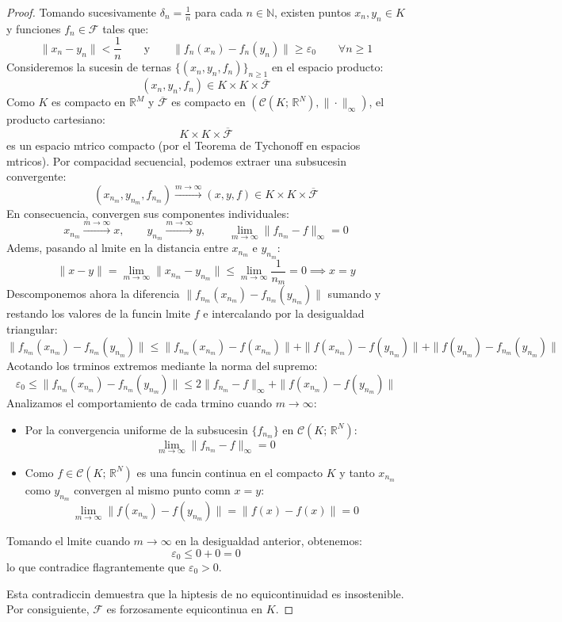 \begin{proof}
    Tomando sucesivamente $\delta_n = \frac{1}{n}$ para cada $n \in \mathbb{N}$, existen puntos $x_n, y_n \in K$ y funciones $f_n \in \mathcal{F}$ tales que:
    \[
        \|x_n - y_n\| < \frac{1}{n} \qquad \text{y} \qquad \|f_n(x_n) - f_n(y_n)\| \geq \varepsilon_0 \qquad \forall n \geq 1
    \]
    Consideremos la sucesin de ternas $\{(x_n, y_n, f_n)\}_{n \geq 1}$ en el espacio producto:
    \[
        (x_n, y_n, f_n) \in K \times K \times \overline{\mathcal{F}}
    \]
    Como $K$ es compacto en $\mathbb{R}^M$ y $\overline{\mathcal{F}}$ es compacto en $(\mathcal{C}(K; \, \mathbb{R}^N), \|\cdot\|_\infty)$, el producto cartesiano:
    \[
        K \times K \times \overline{\mathcal{F}}
    \]
    es un espacio mtrico compacto (por el Teorema de Tychonoff en espacios mtricos). Por compacidad secuencial, podemos extraer una subsucesin convergente:
    \[
        (x_{n_m}, y_{n_m}, f_{n_m}) \xrightarrow{m \to \infty} (x, y, f) \in K \times K \times \overline{\mathcal{F}}
    \]
    En consecuencia, convergen sus componentes individuales:
    \[
        x_{n_m} \xrightarrow{m \to \infty} x, \qquad y_{n_m} \xrightarrow{m \to \infty} y, \qquad \lim_{m \to \infty} \|f_{n_m} - f\|_\infty = 0
    \]
    Adems, pasando al lmite en la distancia entre $x_{n_m}$ e $y_{n_m}$:
    \[
        \|x - y\| = \lim_{m \to \infty} \|x_{n_m} - y_{n_m}\| \leq \lim_{m \to \infty} \frac{1}{n_m} = 0 \implies x = y
    \]
    Descomponemos ahora la diferencia $\|f_{n_m}(x_{n_m}) - f_{n_m}(y_{n_m})\|$ sumando y restando los valores de la funcin lmite $f$ e intercalando por la desigualdad triangular:
    \[
        \|f_{n_m}(x_{n_m}) - f_{n_m}(y_{n_m})\| \leq \|f_{n_m}(x_{n_m}) - f(x_{n_m})\| + \|f(x_{n_m}) - f(y_{n_m})\| + \|f(y_{n_m}) - f_{n_m}(y_{n_m})\|
    \]
    Acotando los trminos extremos mediante la norma del supremo:
    \[
        \varepsilon_0 \leq \|f_{n_m}(x_{n_m}) - f_{n_m}(y_{n_m})\| \leq 2 \|f_{n_m} - f\|_\infty + \|f(x_{n_m}) - f(y_{n_m})\|
    \]
    Analizamos el comportamiento de cada trmino cuando $m \to \infty$:
    \begin{itemize}
        \item Por la convergencia uniforme de la subsucesin $\{f_{n_m}\}$ en $\mathcal{C}(K; \, \mathbb{R}^N)$:
        \[
            \lim_{m \to \infty} \|f_{n_m} - f\|_\infty = 0
        \]
        \item Como $f \in \mathcal{C}(K; \, \mathbb{R}^N)$ es una funcin continua en el compacto $K$ y tanto $x_{n_m}$ como $y_{n_m}$ convergen al mismo punto comn $x = y$:
        \[
            \lim_{m \to \infty} \|f(x_{n_m}) - f(y_{n_m})\| = \|f(x) - f(x)\| = 0
        \]
    \end{itemize}
    Tomando el lmite cuando $m \to \infty$ en la desigualdad anterior, obtenemos:
    \[
        \varepsilon_0 \leq 0 + 0 = 0
    \]
    lo que contradice flagrantemente que $\varepsilon_0 > 0$.

    Esta contradiccin demuestra que la hiptesis de no equicontinuidad es insostenible. Por consiguiente, $\mathcal{F}$ es forzosamente equicontinua en $K$.
\end{proof}
